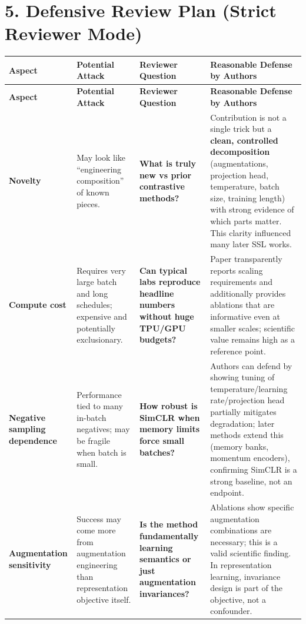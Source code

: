 \documentclass[11pt,a4paper]{article}
\begin{document}
\section*{5. Defensive Review Plan (Strict Reviewer Mode)}
\renewcommand{\arraystretch}{1.25}
\begin{longtable}{p{}p{}p{}p{}}
\toprule
\textbf{Aspect} & \textbf{Potential Attack} & \textbf{Reviewer Question} & \textbf{Reasonable Defense by Authors} \\
\midrule
\endfirsthead
\toprule
\textbf{Aspect} & \textbf{Potential Attack} & \textbf{Reviewer Question} & \textbf{Reasonable Defense by Authors} \\
\midrule
\endhead
\textbf{Novelty} &
May look like ``engineering composition'' of known pieces. &
\textbf{What is truly new vs prior contrastive methods?} &
Contribution is not a single trick but a \textbf{clean, controlled decomposition} (augmentations, projection head, temperature, batch size, training length) with strong evidence of which parts matter. This clarity influenced many later SSL works. \\

\textbf{Compute cost} &
Requires very large batch and long schedules; expensive and potentially exclusionary. &
\textbf{Can typical labs reproduce headline numbers without huge TPU/GPU budgets?} &
Paper transparently reports scaling requirements and additionally provides ablations that are informative even at smaller scales; scientific value remains high as a reference point. \\

\textbf{Negative sampling dependence} &
Performance tied to many in-batch negatives; may be fragile when batch is small. &
\textbf{How robust is SimCLR when memory limits force small batches?} &
Authors can defend by showing tuning of temperature/learning rate/projection head partially mitigates degradation; later methods extend this (memory banks, momentum encoders), confirming SimCLR is a strong baseline, not an endpoint. \\

\textbf{Augmentation sensitivity} &
Success may come more from augmentation engineering than representation objective itself. &
\textbf{Is the method fundamentally learning semantics or just augmentation invariances?} &
Ablations show specific augmentation combinations are necessary; this is a valid scientific finding. In representation learning, invariance design is part of the objective, not a confounder. \\


\end{longtable}
\end{document}
